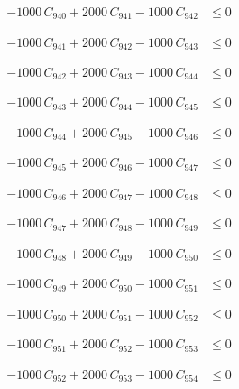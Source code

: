 \documentclass[a4paper,11pt]{article}
\begin{document}
\begin{align}
-1000\,C_{940} + 2000\,C_{941} - 1000\,C_{942} &\leq 0 \nonumber
\end{align}

\begin{align}
-1000\,C_{941} + 2000\,C_{942} - 1000\,C_{943} &\leq 0 \nonumber
\end{align}

\begin{align}
-1000\,C_{942} + 2000\,C_{943} - 1000\,C_{944} &\leq 0 \nonumber
\end{align}

\begin{align}
-1000\,C_{943} + 2000\,C_{944} - 1000\,C_{945} &\leq 0 \nonumber
\end{align}

\begin{align}
-1000\,C_{944} + 2000\,C_{945} - 1000\,C_{946} &\leq 0 \nonumber
\end{align}

\begin{align}
-1000\,C_{945} + 2000\,C_{946} - 1000\,C_{947} &\leq 0 \nonumber
\end{align}

\begin{align}
-1000\,C_{946} + 2000\,C_{947} - 1000\,C_{948} &\leq 0 \nonumber
\end{align}

\begin{align}
-1000\,C_{947} + 2000\,C_{948} - 1000\,C_{949} &\leq 0 \nonumber
\end{align}

\begin{align}
-1000\,C_{948} + 2000\,C_{949} - 1000\,C_{950} &\leq 0 \nonumber
\end{align}

\begin{align}
-1000\,C_{949} + 2000\,C_{950} - 1000\,C_{951} &\leq 0 \nonumber
\end{align}

\begin{align}
-1000\,C_{950} + 2000\,C_{951} - 1000\,C_{952} &\leq 0 \nonumber
\end{align}

\begin{align}
-1000\,C_{951} + 2000\,C_{952} - 1000\,C_{953} &\leq 0 \nonumber
\end{align}

\begin{align}
-1000\,C_{952} + 2000\,C_{953} - 1000\,C_{954} &\leq 0 \nonumber
\end{align}
\end{document}
